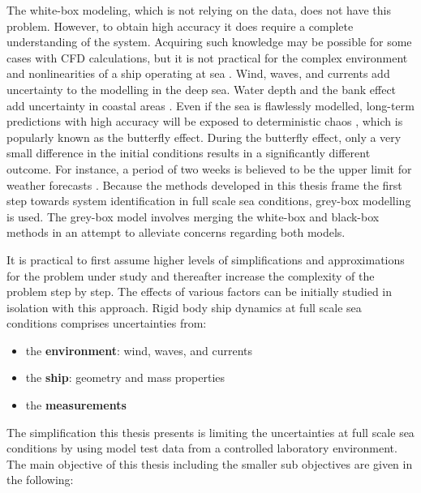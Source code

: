 The white-box modeling, which is not relying on the data, does not have this problem. However, to obtain high accuracy it does require a complete understanding of the system. Acquiring such knowledge may be possible for some cases with CFD calculations, but it is not practical for the complex environment and nonlinearities of a ship operating at sea \cite{miller_ship_2021}. 
Wind, waves, and currents add uncertainty to the modelling in the deep sea. Water depth and the bank effect add uncertainty in coastal areas \cite{nielsen_machine_2022}. 
Even if the sea is flawlessly modelled, long-term predictions with high accuracy will be exposed to deterministic chaos \cite{lorenz_deterministic_1963}, which is popularly known as the butterfly effect. During the butterfly effect, only a very small difference in the initial conditions results in a significantly different outcome. For instance, a period of two weeks is believed to be the upper limit for weather forecasts  \cite{zhang_what_2019}. Because the methods developed in this thesis frame the first step towards system identification in full scale sea conditions, grey-box modelling is used. The grey-box model involves merging the white-box and black-box methods in an attempt to alleviate concerns regarding both models. 

It is practical to first assume higher levels of simplifications and approximations for the problem under study and thereafter increase the complexity of the problem step by step. The effects of various factors can be initially studied in isolation with this approach. 
Rigid body ship dynamics at full scale sea conditions comprises uncertainties from:
\vspace{5pt}
\begin{itemize}
    \setlength\itemsep{5pt}
    \item the \textbf{environment}: wind, waves, and currents
    \item the \textbf{ship}: geometry and mass properties
    \item the \textbf{measurements}
\end{itemize}
\vspace{5pt}

\noindent The simplification this thesis presents is limiting the uncertainties at full scale sea conditions by using model test data from a controlled laboratory environment. The main objective of this thesis including the smaller sub objectives are given in the following:

